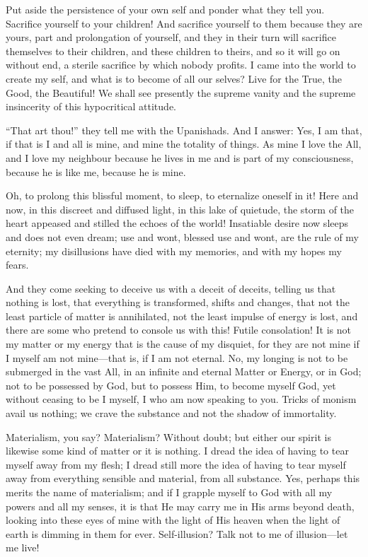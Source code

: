 Put aside the persistence of your own self and ponder what they tell
you. Sacrifice yourself to your children! And sacrifice yourself to
them because they are yours, part and prolongation of yourself, and
they in their turn will sacrifice themselves to their children, and
these children to theirs, and so it will go on without end, a sterile
sacrifice by which nobody profits. I came into the world to create my
self, and what is to become of all our selves? Live for the True, the
Good, the Beautiful! We shall see presently the supreme vanity and the
supreme insincerity of this hypocritical attitude.

``That art thou!'' they tell me with the Upanishads. And I answer:
Yes, I am that, if that is I and all is mine, and mine the totality of
things. As mine I love the All, and I love my neighbour because he
lives in me and is part of my consciousness, because he is like me,
because he is mine.

Oh, to prolong this blissful moment, to sleep, to eternalize oneself
in it! Here and now, in this discreet and diffused light, in this lake
of quietude, the storm of the heart appeased and stilled the echoes of
the world! Insatiable desire now sleeps and does not even dream; use
and wont, blessed use and wont, are the rule of my eternity; my
disillusions have died with my memories, and with my hopes my fears.

And they come seeking to deceive us with a deceit of deceits, telling
us that nothing is lost, that everything is transformed, shifts and
changes, that not the least particle of matter is annihilated, not the
least impulse of energy is lost, and there are some who pretend to
console us with this! Futile consolation! It is not my matter or my
energy that is the cause of my disquiet, for they are not mine if I
myself am not mine---that is, if I am not eternal. No, my longing is
not to be submerged in the  vast All, in an infinite and
eternal Matter or Energy, or in God; not to be possessed by God, but
to possess Him, to become myself God, yet without ceasing to be I
myself, I who am now speaking to you. Tricks of monism avail us
nothing; we crave the substance and not the shadow of immortality.

Materialism, you say? Materialism? Without doubt; but either our
spirit is likewise some kind of matter or it is nothing. I dread the
idea of having to tear myself away from my flesh; I dread still more
the idea of having to tear myself away from everything sensible and
material, from all substance. Yes, perhaps this merits the name of
materialism; and if I grapple myself to God with all my powers and all
my senses, it is that He may carry me in His arms beyond death,
looking into these eyes of mine with the light of His heaven when the
light of earth is dimming in them for ever. Self-illusion? Talk not to
me of illusion---let me live!

